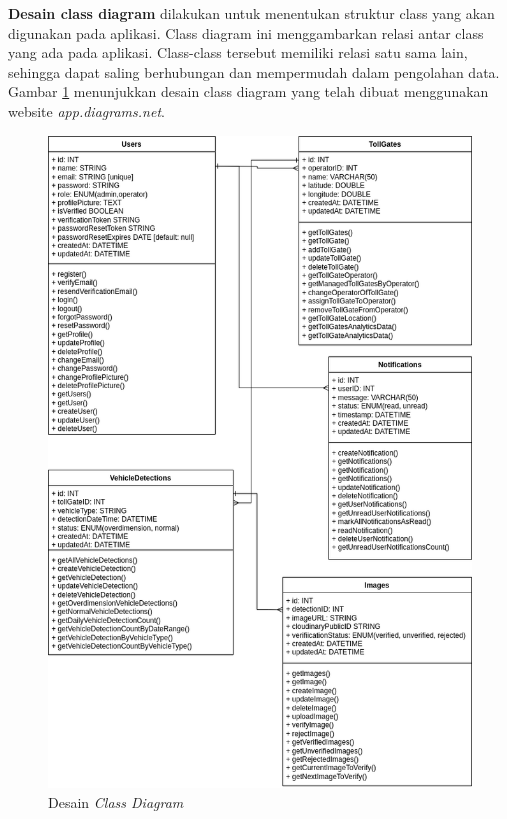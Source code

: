 \textbf{Desain class diagram} dilakukan untuk menentukan struktur class yang akan digunakan pada aplikasi. Class diagram ini menggambarkan relasi antar class yang ada pada aplikasi. Class-class tersebut memiliki relasi satu sama lain, sehingga dapat saling berhubungan dan mempermudah dalam pengolahan data. Gambar \ref{fig:classdiagram} menunjukkan desain class diagram yang telah dibuat menggunakan website \emph{app.diagrams.net}.

\begin{figure}[htbp]
  \centering

  \includegraphics[scale=0.6]{gambar/bab3-class-diagram.png}

  \caption{Desain \emph{Class Diagram}}
  \label{fig:classdiagram}
\end{figure}
